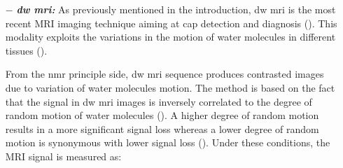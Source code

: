\begin{enumerate}[leftmargin=*]
\item[$-$] \textbf{\textit{\ac{dw} \ac{mri}:}} As previously mentioned in the introduction, \ac{dw} \ac{mri} is the most recent MRI imaging technique aiming at \ac{cap} detection and diagnosis (\cite{Scheidler1999}). This modality exploits the variations in the motion of water molecules in different tissues (\cite{LeBihan1988,Koh2007}).


From the \ac{nmr} principle side, \ac{dw} \ac{mri} sequence produces contrasted images due to variation of water molecules motion. The method is based on the fact that the signal in \ac{dw} \ac{mri} images is inversely correlated to the degree of random motion of water molecules (\cite{Huisman2003}). %
A higher degree of random motion results in a more significant signal loss whereas a lower degree of random motion is synonymous with lower signal loss (\cite{Huisman2003}). Under these conditions, the MRI signal is measured as:


\end{enumerate}
